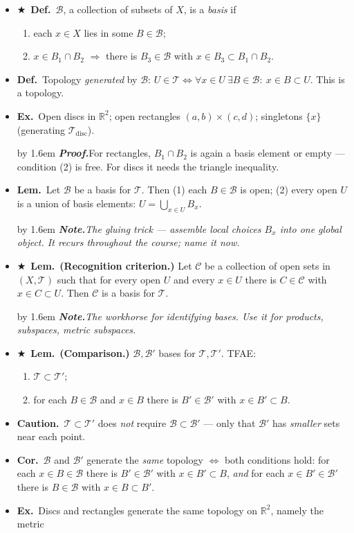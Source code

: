 \documentclass[12pt,a4paper]{article}
\newcommand{\Dfn}{\textbf{Def.}~}
\newcommand{\Lem}{\textbf{Lem.}~}
\newcommand{\Cor}{\textbf{Cor.}~}
\newcommand{\Exa}{\textbf{Ex.}~}
\newcommand{\Warn}{\textbf{Caution.}~}
\newcommand{\Key}{$\bigstar$~}                  %
\newcommand{\Pf}[1]{%
  \par\addvspace{7pt}\nopagebreak
  \begingroup
    \advance\leftskip by 1.6em
    \parindent=0pt \small\color{prf}%
    \textbf{\textit{Proof.}}\enspace #1\par
  \endgroup
  \addvspace{9pt}}
\newcommand{\Cue}[1]{%
  \par\addvspace{7pt}\nopagebreak
  \begingroup
    \advance\leftskip by 1.6em
    \parindent=0pt \small\color{cue}%
    \textbf{\textit{Note.}}\enspace \textit{#1}\par
  \endgroup
  \addvspace{9pt}}
\newenvironment{BL}%
  {\begin{itemize}[leftmargin=1.4em,labelsep=0.55em,itemsep=11pt,topsep=11pt,parsep=0pt]}%
  {\end{itemize}}
\newenvironment{NL}%
  {\begin{enumerate}[label=(\arabic*),leftmargin=2em,labelsep=0.45em,itemsep=6pt,topsep=7pt,parsep=0pt]}%
  {\end{enumerate}}
\newcommand{\RR}{\mathbb{R}}
\newcommand{\cT}{\mathcal{T}}
\newcommand{\cB}{\mathcal{B}}
\newcommand{\cC}{\mathcal{C}}
\renewcommand{\iff}{\Leftrightarrow}
\newcommand{\imp}{\Rightarrow}
\newcommand{\Tdisc}{\cT_{\mathrm{disc}}}
\begin{document}
\begin{BL}
\item \Key\Dfn $\cB$, a collection of subsets of $X$, is a \emph{basis} if
  \begin{NL}
  \item each $x\in X$ lies in some $B\in\cB$;
  \item $x\in B_1\cap B_2$ $\imp$ there is $B_3\in\cB$ with $x\in B_3\subset B_1\cap B_2$.
  \end{NL}
\item \Dfn Topology \emph{generated} by $\cB$:
      \(U\in\cT\iff\forall x\in U\ \exists B\in\cB:\ x\in B\subset U.\)
      This is a topology.
\item \Exa Open discs in $\RR^2$;\; open rectangles $(a,b)\times(c,d)$;\;
      singletons $\{x\}$ (generating $\Tdisc$).
\Pf{For rectangles, $B_1\cap B_2$ is again a basis element or empty --- condition (2) is free.
For discs it needs the triangle inequality.}
\item \Lem Let $\cB$ be a basis for $\cT$. Then (1) each $B\in\cB$ is open;
      (2) every open $U$ is a union of basis elements: $U=\bigcup_{x\in U}B_x$.
\Cue{The gluing trick --- assemble local choices $B_x$ into one global object. It recurs
throughout the course; name it now.}
\item \Key\Lem \textbf{(Recognition criterion.)} Let $\cC$ be a collection of open sets in
      $(X,\cT)$ such that for every open $U$ and every $x\in U$ there is $C\in\cC$ with
      $x\in C\subset U$. Then $\cC$ is a basis for $\cT$.
\Cue{The workhorse for identifying bases. Use it for products, subspaces, metric subspaces.}
\item \Key\Lem \textbf{(Comparison.)} $\cB,\cB'$ bases for $\cT,\cT'$. TFAE:
  \begin{NL}
  \item $\cT\subset\cT'$;
  \item for each $B\in\cB$ and $x\in B$ there is $B'\in\cB'$ with $x\in B'\subset B$.
  \end{NL}
\item \Warn $\cT\subset\cT'$ does \emph{not} require $\cB\subset\cB'$ --- only that
      $\cB'$ has \emph{smaller} sets near each point.
\item \Cor $\cB$ and $\cB'$ generate the \emph{same} topology $\iff$ both conditions hold:
      for each $x\in B\in\cB$ there is $B'\in\cB'$ with $x\in B'\subset B$,
      \emph{and} for each $x\in B'\in\cB'$ there is $B\in\cB$ with $x\in B\subset B'$.
\item \Exa Discs and rectangles generate the same topology on $\RR^2$, namely the metric

\end{BL}
\end{document}

